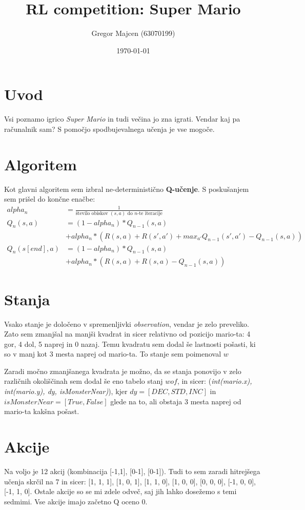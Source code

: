 \documentclass[a4paper,11pt]{article}
\title{RL competition: Super Mario}
\author{Gregor Majcen (63070199)}
\date{\today}
\begin{document}
\maketitle

\section{Uvod}
Vsi poznamo igrico {\it Super Mario} in tudi večina jo zna igrati. Vendar kaj pa računalnik sam? S pomočjo spodbujevalnega učenja je vse mogoče.

\section{Algoritem}
 Kot glavni algoritem sem izbral ne-deterministično {\bf Q-učenje}. S poskušanjem sem prišel do končne enačbe:
\begin{align}
    alpha_n &= \frac{1}{\text{število obiskov $(s,a)$ do $n$-te iteracije}} \\
    Q_n(s,a) &= (1-alpha_n) * Q_{n-1}(s,a) \nonumber\\&+ alpha_n * ( R(s,a) + R(s',a') + max_{a'}Q_{n-1}(s',a') -  Q_{n-1}(s,a))\\
    Q_n(s[end],a) &= (1-alpha_n) * Q_{n-1}(s,a) \nonumber\\&+ alpha_n * (R(s,a) + R(s,a) -  Q_{n-1}(s,a))
\end{align}

\section{Stanja}
Vsako stanje je določeno v spremenljivki {\it observation}, vendar je zelo preveliko. Zato sem zmanjšal na manjši kvadrat in sicer relativno od pozicijo mario-ta: 4 gor, 4 dol, 5 naprej in 0 nazaj. Temu kvadratu sem dodal še lastnosti pošasti, ki so v manj kot 3 mesta naprej od mario-ta. To stanje sem poimenoval $w$

Zaradi močno zmanjšanega kvadrata je možno, da se stanja ponovijo v zelo različnih okoliščinah sem dodal še eno tabelo stanj $wof$, in sicer: ({\it int(mario.x), int(mario.y), dy, isMonsterNear)}), kjer $dy = [DEC, STD, INC]$ in $isMonsterNear = [True, False]$ glede na to, ali obstaja 3 mesta naprej od mario-ta kakšna pošast.

\section{Akcije}
Na voljo je 12 akcij (kombinacija [-1,1], [0-1], [0-1]). Tudi to sem zaradi hitrejšega učenja skrčil na 7 in sicer: [1, 1, 1], [1, 0, 1], [1, 1, 0], [1, 0, 0], [0, 0, 0], [-1, 0, 0], [-1, 1, 0]. Ostale akcije so se mi zdele odveč, saj jih lahko dosežemo s temi sedmimi. Vse akcije imajo začetno Q oceno 0.
\end{document}
